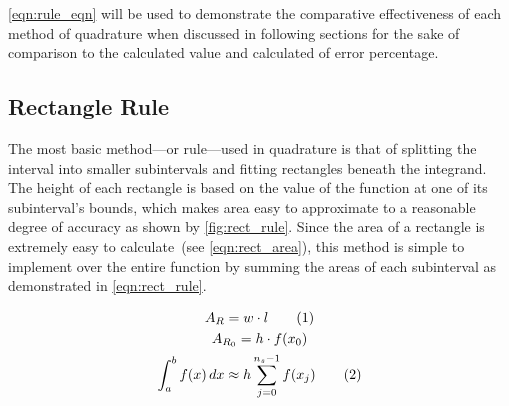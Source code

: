 \documentclass{paper}
\begin{document}
\cref{eqn:rule_eqn} will be used to demonstrate the comparative effectiveness of each method of quadrature when discussed in following sections for the sake of comparison to the calculated value and calculated of error percentage.

\subsection{Rectangle Rule}
\label{sec:rect_rule}
The most basic method---or rule---used in quadrature is that of splitting the interval into smaller subintervals and fitting rectangles beneath the integrand.
The height of each rectangle is based on the value of the function at one of its subinterval's bounds, which makes area easy to approximate to a reasonable degree of accuracy as shown by \cref{fig:rect_rule}.
Since the area of a rectangle is extremely easy to calculate~(see \cref{eqn:rect_area}), this method is simple to implement over the entire function by summing the areas of each subinterval as demonstrated in \cref{eqn:rect_rule}.\autocite{num_methods}

\begin{gather*}
    A_{R} = w \cdot l \tageq\label{eqn:rect_area}                                               \\
    A_{R_{0}} = h \cdot f(x_0)                                                                  \\
    \int_a^b f(x) \,dx \approx h \sum^{n_s-1}_{j=0}f(x_j) \tageq\label{eqn:rect_rule}
\end{gather*}


\end{document}
